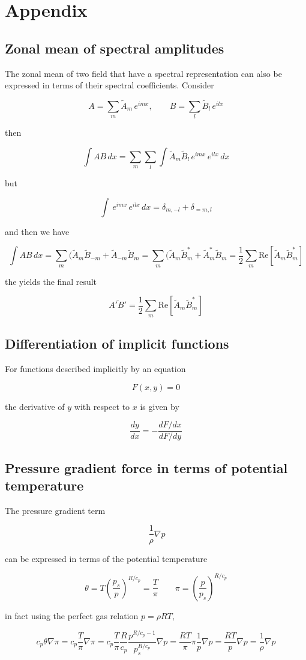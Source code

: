 \section{Appendix}\label{appendix}

\subsection{Zonal mean of spectral amplitudes}\label{chp:spekamp}

The zonal mean of two field that have a spectral representation can also
be expressed in terms of their spectral coefficients. Consider

\[A =\sum_m\tilde{A}_m\,e^{imx}, \qquad B =\sum_l\tilde{B}_l\,e^{ilx}\]

then

\[\int A B\, dx = \sum_m\sum_l\int \tilde{A}_m\tilde{B}_l \,e^{imx}\,e^{ilx}\, dx\]

but

\[\int \,e^{imx}\,e^{ilx}\, dx = \delta_{m,-l} + \delta_{=m,l}\]

and then we have

\[\int A B\, dx = \sum_m( \tilde{A}_m\tilde{B}_{-m} + \tilde{A}_{-m}\tilde{B}_m = \sum_m ( \tilde{A}_m \tilde{B}^*_m + \tilde{A}_m^* \tilde{B}_m = \frac{1}{2}\sum_m \mathrm{Re}\left[ \tilde{A}_m \tilde{B}_m^*\right]\]

the yields the final result

\[\overline{A'B'} = \frac{1}{2}\sum_m \mathrm{Re}\left[ \tilde{A}_m \tilde{B}_m^*\right]\]

\subsection{Differentiation of implicit functions}\label{chp:B}

For functions described implicitly by an equation

\[F(x,y) = 0\]

the derivative of \(y\) with respect to \(x\) is given by

\[\frac{dy}{dx} = -\frac{dF/dx}{dF/dy}\]

\subsection{Pressure gradient force in terms of potential
temperature}\label{pressure-gradient-force-in-terms-of-potential-temperature}

The pressure gradient term

\[\
\frac{1}{\rho}\nabla p\]

can be expressed in terms of the potential temperature

\[\theta = T\left(\frac{p_s}{p}\right)^{R/c_p} = \frac{T}{\pi} \qquad \pi =\left(\frac{p}{p_s}\right)^{R/c_p}\]

in fact using the perfect gas relation \(p=\rho R T\),

\[c_p\theta\nabla\pi =c_p\frac{T}{\pi}\nabla\pi = c_p \frac{T}{\pi} \frac{R}{c_p}\frac{p^{R/c_p -1}}{p_s^{R/c_p}}\nabla p = \frac{R T}{\pi} \pi \frac{1}{p} \nabla p = \frac{RT}{p}\nabla p =\frac{1}{\rho}\nabla p\]

